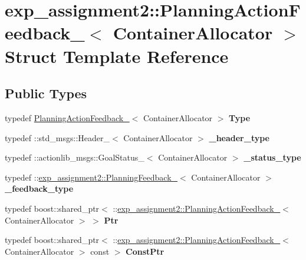 \hypertarget{structexp__assignment2_1_1PlanningActionFeedback__}{}\section{exp\+\_\+assignment2\+:\+:Planning\+Action\+Feedback\+\_\+$<$ Container\+Allocator $>$ Struct Template Reference}
\label{structexp__assignment2_1_1PlanningActionFeedback__}
\subsection*{Public Types}
\begin{DoxyCompactItemize}
\item 
\mbox{\label{structexp__assignment2_1_1PlanningActionFeedback___a82a7e8399137dff30e70375ebdf0e4d7}} 
typedef \hyperlink{structexp__assignment2_1_1PlanningActionFeedback__}{Planning\+Action\+Feedback\+\_\+}$<$ Container\+Allocator $>$ {\bfseries Type}
\item 
\mbox{\label{structexp__assignment2_1_1PlanningActionFeedback___a9f286c67a16de67810ee8f3124b3b775}} 
typedef \+::std\+\_\+msgs\+::\+Header\+\_\+$<$ Container\+Allocator $>$ {\bfseries \+\_\+header\+\_\+type}
\item 
\mbox{\label{structexp__assignment2_1_1PlanningActionFeedback___a64552049796f2e37f7e63c3bbbd6a66e}} 
typedef \+::actionlib\+\_\+msgs\+::\+Goal\+Status\+\_\+$<$ Container\+Allocator $>$ {\bfseries \+\_\+status\+\_\+type}
\item 
\mbox{\label{structexp__assignment2_1_1PlanningActionFeedback___aacdb59b399182ef4075d05a2a2f672fe}} 
typedef \+::\hyperlink{structexp__assignment2_1_1PlanningFeedback__}{exp\+\_\+assignment2\+::\+Planning\+Feedback\+\_\+}$<$ Container\+Allocator $>$ {\bfseries \+\_\+feedback\+\_\+type}
\item 
\mbox{\label{structexp__assignment2_1_1PlanningActionFeedback___ae3abdac037131c774c617464257d83d0}} 
typedef boost\+::shared\+\_\+ptr$<$ \+::\hyperlink{structexp__assignment2_1_1PlanningActionFeedback__}{exp\+\_\+assignment2\+::\+Planning\+Action\+Feedback\+\_\+}$<$ Container\+Allocator $>$ $>$ {\bfseries Ptr}
\item 
\mbox{\label{structexp__assignment2_1_1PlanningActionFeedback___a2f88d6fcee8bc54624d9f1a9b6ad8bcd}} 
typedef boost\+::shared\+\_\+ptr$<$ \+::\hyperlink{structexp__assignment2_1_1PlanningActionFeedback__}{exp\+\_\+assignment2\+::\+Planning\+Action\+Feedback\+\_\+}$<$ Container\+Allocator $>$ const  $>$ {\bfseries Const\+Ptr}
\end{DoxyCompactItemize}
